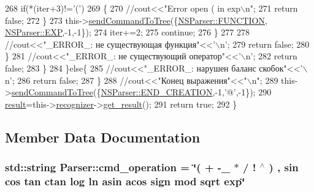 \begin{DoxyCode}
268                     \textcolor{keywordflow}{if}(*(iter+3)!=\textcolor{charliteral}{'('})
269                     \{
270                          \textcolor{comment}{//cout<<"Error open ( in exp\(\backslash\)n";}
271                          \textcolor{keywordflow}{return} \textcolor{keyword}{false};
272                     \}
273                     this->\hyperlink{classParser_ac61a1fedefe50ed900f0e65c029053c1}{sendCommandToTree}(\{\hyperlink{namespaceNSParser_aca012df556c0413c6166348fdd62c4eba4adabba7d2f386bba54639075a582a36}{NSParser::FUNCTION},
      \hyperlink{namespaceNSParser_aae20df1402d72f463a1a9efe3ce1a9b9a189aff615329a6c73a15282170e4aefb}{NSParser::EXP},-1,-1\});
274                     iter+=2;
275                     \textcolor{keywordflow}{continue};
276                 \}
277 
278                 \textcolor{comment}{//cout<<"\_ERROR\_: не существующая функция"<<'\(\backslash\)n';}
279                 \textcolor{keywordflow}{return} \textcolor{keyword}{false};
280             \}
281             \textcolor{comment}{//cout<<"\_ERROR\_: не существующий оператор"<<'\(\backslash\)n';}
282             \textcolor{keywordflow}{return} \textcolor{keyword}{false};
283         \}
284     \}\textcolor{keywordflow}{else}\{
285         \textcolor{comment}{//cout<<"\_ERROR\_: нарушен баланс скобок"<<'\(\backslash\)n';}
286         \textcolor{keywordflow}{return} \textcolor{keyword}{false};
287     \}
288     \textcolor{comment}{//cout<<"Конец выражения"<<"\(\backslash\)n";}
289     this->\hyperlink{classParser_ac61a1fedefe50ed900f0e65c029053c1}{sendCommandToTree}(\{\hyperlink{namespaceNSParser_aca012df556c0413c6166348fdd62c4eba746882bf4644e9d73388d3132719bcf4}{NSParser::END\_CREATION},-1,\textcolor{charliteral}{'@'},-1\});
290     \hyperlink{classParser_adab1eb7202f5042fa2daa7cd4238799e}{result}=this->\hyperlink{classParser_a095ffde82968c2b8b067752f1b7ff9f5}{recognizer}->\hyperlink{classRecognizer_a31399be9b5e3eaf37dc90a749ed771bb}{get\_result}();
291     \textcolor{keywordflow}{return} \textcolor{keyword}{true};
292 \}
\end{DoxyCode}


\subsection{Member Data Documentation}
\hypertarget{classParser_aab0019b329a95aca59b17250045ca808}{}
\subsubsection[{cmd\+\_\+operation}]{\setlength{\rightskip}{0pt plus 5cm}std\+::string Parser\+::cmd\+\_\+operation = \char`\"{}( + -\/\+\_\+ $\ast$ / ! $^\wedge$ ) , sin cos tan ctan log ln asin acos sign mod sqrt exp\char`\"{}\hspace{0.3cm}{\ttfamily [private]}}\label{classParser_aab0019b329a95aca59b17250045ca808}


